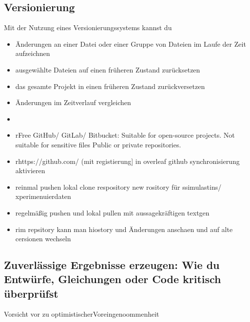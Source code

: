 \subsection{Versionierung}



Mit der Nutzung eines Versionierungssystems kannst du
\begin{itemize}
    \item Änderungen an einer Datei oder einer Gruppe von Dateien im Laufe der Zeit aufzeichnen
    \item ausgewählte Dateien auf einen früheren Zustand zurücksetzen
    \item das gesamte Projekt in einen früheren Zustand zurückversetzen 
    \item Änderungen im Zeitverlauf vergleichen
    \item 
    
\end{itemize}
 
\begin{itemize}

\item rFree GitHub/ GitLab/ Bitbucket: 
Suitable for open-source projects. Not suitable for sensitive files 
Public or private repositories.

\item rhttps://github.com/
(mit registierung] in overleaf github synchronisierung aktivieren

\item reinmal pushen lokal clone respository new rository für ssimulastins/ xperimenuierdaten

\item regelmäßig pushen und lokal pullen mit aussagekräftigen textgen

\item rim repsitory kann man hiostory und Änderungen anschaen und auf alte cersionen wechseln
    
\end{itemize}

\subsection[Zuverlässige Ergebnisse erzeugen]{Zuverlässige Ergebnisse erzeugen: Wie du Entwürfe, Gleichungen oder Code kritisch überprüfst}

Vorsicht vor zu optimistischerVoreingenoommenheit


